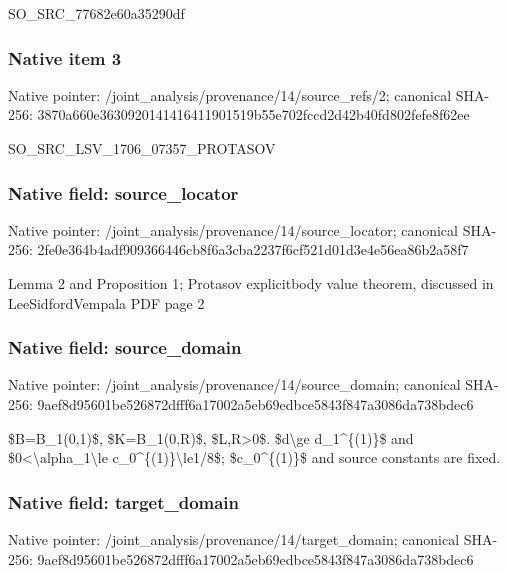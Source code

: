 \documentclass[10pt,a4paper]{article}
\begin{document}
SO\_SRC\_77682e60a35290df


\subsubsection{Native item 3}


Native pointer: /joint\_analysis/provenan\allowbreak{}ce/14/source\_refs/2; canonical SHA-256: 3870a660e363092014141641\allowbreak{}1901519b55e702fccd2d42b4\allowbreak{}0fd802fefe8f62ee


SO\_SRC\_LSV\_1706\_07357\_PROTASOV


\subsubsection{Native field: source\_locator}


Native pointer: /joint\_analysis/provenan\allowbreak{}ce/14/source\_locator; canonical SHA-256: 2fe0e364b4adf909366446cb\allowbreak{}8f6a3cba2237f6cf521d01d3\allowbreak{}e4e56ea86b2a58f7


Lemma 2 and Proposition 1; Protasov explicitbody value theorem, discussed in LeeSidfordVempala PDF page 2


\subsubsection{Native field: source\_domain}


Native pointer: /joint\_analysis/provenan\allowbreak{}ce/14/source\_domain; canonical SHA-256: 9aef8d95601be526872dfff6\allowbreak{}a17002a5eb69edbce5843f84\allowbreak{}7a3086da738bdec6


\$B=B\_1(0,1)\$, \$K=B\_1(0,R)\$, \$L,R>0\$. \$d\textbackslash{}ge d\_1\textasciicircum{}\{(1)\}\$ and \$0<\textbackslash{}alpha\_1\textbackslash{}le c\_0\textasciicircum{}\{(1)\}\textbackslash{}le1/8\$; \$c\_0\textasciicircum{}\{(1)\}\$ and source constants are fixed.


\subsubsection{Native field: target\_domain}


Native pointer: /joint\_analysis/provenan\allowbreak{}ce/14/target\_domain; canonical SHA-256: 9aef8d95601be526872dfff6\allowbreak{}a17002a5eb69edbce5843f84\allowbreak{}7a3086da738bdec6
\end{document}
